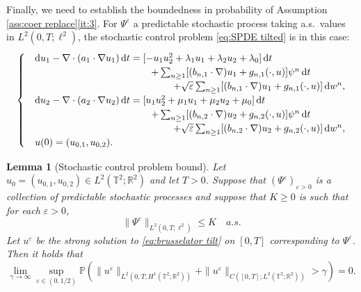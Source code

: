 \documentclass{amsart}
\newcommand{\dd}{\,\mathrm{d}}
\newcommand{\ddd}{\mathrm{d}}
\newcommand{\<}{\langle}
\newcommand{\?}{\rangle}
\newcommand{\bphieps}{\Psi^{\eps}}
\newcommand{\Tor}{\mathbb{T}}
\renewcommand{\Tor}{\mathbb{T}^2}
\theoremstyle{plain}
\theoremstyle{remark}
\theoremstyle{plain}
\newtheorem{lemma}[theorem]{Lemma}
\numberwithin{equation}{section}
\def\R{{\mathbb R}}
\renewcommand{\P}{\mathbb{P}}
\newcommand{\eps}{\varepsilon}
\begin{document}
Finally, we need to establish the boundedness in probability of Assumption \ref{ass:coer replace}\ref{it:3}. 
For  $\bphieps$   a predictable stochastic process taking a.s.\ values in $L^2(0,T;\ell^2)$, the stochastic control problem \eqref{eq:SPDE tilted} is in this case: 
 \begin{equation}\label{eq:brusselator tilt}
     \begin{cases}
    &\ddd u_1-\nabla\cdot(a_1\cdot\nabla u_1) \dd t =[ -u_1u_2^2 +\lambda_1u_1+\lambda_2u_2+\lambda_0]\dd t  \\
    &\hspace{4.2cm}+\sum_{n\geq 1}[(b_{n,1}\cdot\nabla)u_1+g_{n,1}(\cdot,u)]  \psi^n \dd t  \\
   &\hspace{5cm}+\sqrt{\eps}\sum_{n\geq 1}[(b_{n,1}\cdot\nabla)u_1+g_{n,1}(\cdot,u)]\dd w^n,\\
    &\ddd u_2-\nabla\cdot(a_2\cdot\nabla u_2)\dd t  =  [u_1u_2^2 +\mu_1u_1+\mu_2u_2+\mu_0]\dd t \\
    &\hspace{4.2cm} +\sum_{n\geq 1}[(b_{n,2}\cdot\nabla)u_2+g_{n,2}(\cdot,u)]  \psi^n \dd t \\
   & \hspace{5cm}  +\sqrt{\eps}\sum_{n\geq 1}[(b_{n,2}\cdot\nabla)u_2+g_{n,2}(\cdot,u)]\dd w^n,\\
   &u(0)=(u_{0,1},u_{0,2}).
\end{cases}
\end{equation}

\begin{lemma}[Stochastic control problem bound]\label{lem:tiltbrusselator}
Let $u_0=(u_{0,1},u_{0,2})\in  L^2(\Tor;\R^2)$ and let $T>0$. 
Suppose that $(\bphieps)_{\eps>0}$ is a collection of predictable stochastic processes and suppose that $K\geq 0$ is such that for each $\eps>0$, 
\begin{equation}\label{eq:less K} 
    \|\bphieps\|_{L^2(0,T;\ell^2)}\leq K \quad   a.s.  
\end{equation}
Let $u^\eps$ be the strong solution to \eqref{eq:brusselator tilt} on $[0,T]$ corresponding to $\bphieps$. Then it holds that 
\begin{equation}\label{eq:lim tilt bruss} 
\lim_{\gamma\to\infty}\sup_{\eps\in(0,1/2)}\P(\|u^\eps\|_{L^2(0,T;H^1(\Tor;\R^2))}+\|u^\eps\|_{C([0,T]; L^2(\Tor;\R^2))} >\gamma)=0.
\end{equation}
\end{lemma}
 
\end{document}
